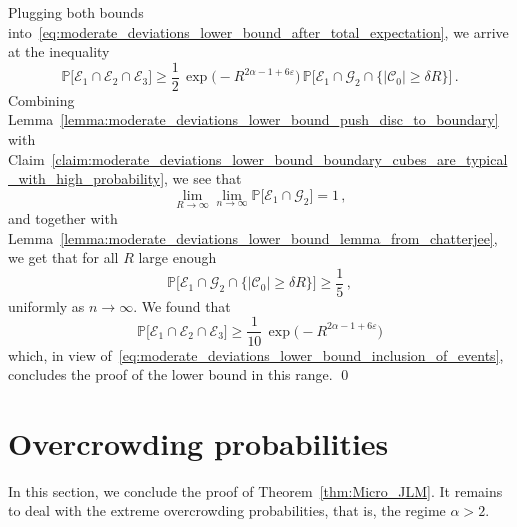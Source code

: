 \documentclass[11pt]{amsart}
\theoremstyle{definition}
\theoremstyle{remark}
\numberwithin{equation}{section}
\def\eps{{\varepsilon}}
\newcommand{\bP}{\mathbb P}
\begin{document}
	Plugging both bounds into~\eqref{eq:moderate_deviations_lower_bound_after_total_expectation}, we arrive at the inequality
	\[
	\bP\Big[\mathcal{E}_1\cap \mathcal{E}_2 \cap \mathcal{E}_3 \Big] \ge \frac{1}{2}  \, \exp\Big(-R^{2\alpha-1+6\eps}\Big) \, \bP\big[\mathcal{E}_1\cap \mathcal{G}_2 \cap \big\{|\mathcal{C}_0| \ge \delta R\big\}\big] \, .
	\]
	Combining Lemma~\ref{lemma:moderate_deviations_lower_bound_push_disc_to_boundary} with Claim~\ref{claim:moderate_deviations_lower_bound_boundary_cubes_are_typical_with_high_probability}, we see that
	\[
	\lim_{R\to \infty} \lim_{n\to \infty} \bP\big[\mathcal{E}_1\cap \mathcal{G}_2\big] = 1\, ,
	\]
	and together with Lemma~\ref{lemma:moderate_deviations_lower_bound_lemma_from_chatterjee}, we get that for all $R$ large enough
	\[
	\bP\big[\mathcal{E}_1\cap \mathcal{G}_2 \cap \big\{|\mathcal{C}_0| \ge \delta R\big\}\big]  \ge \frac{1}{5} \, ,
	\] 
	uniformly as $n\to\infty$. We found that
	\[
	\bP\Big[\mathcal{E}_1\cap \mathcal{E}_2 \cap \mathcal{E}_3 \Big] \ge \frac{1}{10}  \, \exp\Big(-R^{2\alpha-1+6\eps}\Big) 
	\]
	which, in view of~\eqref{eq:moderate_deviations_lower_bound_inclusion_of_events}, concludes the proof of the lower bound in this range.
	\qed
	\section{Overcrowding probabilities}
	\label{sec:overcrowding}
	In this section, we conclude the proof of Theorem~\ref{thm:Micro_JLM}. It remains to deal with the extreme overcrowding probabilities, that is, the regime $\alpha>2$. 
\end{document}
